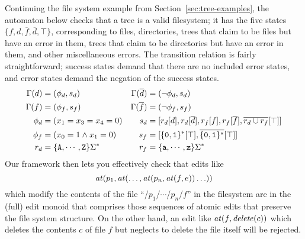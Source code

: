 Continuing the file system example from Section~\ref{sec:tree-examples},
the automaton below checks that a tree is a valid filesystem; it
has the five states $\{f, d, \overline f, \overline d, \top\}$,
corresponding to files, directories, trees that claim to be files but have
an error in them, trees that claim to be directories but have an error in
them, and other miscellaneous errors. The transition relation is fairly
straightforward; success states demand that there are no included error
states, and error states demand the negation of the success states.
\begin{align*}
    \Gamma(d) &= (\phi_d,s_d) &
    \Gamma(\overline d) &= (\lnot \phi_d,s_d) \\
    \Gamma(f) &= (\phi_f,s_f) &
    \Gamma(\overline f) &= (\lnot \phi_f,s_f) \\
    \phi_d &= (x_1 = x_3 = x_4 = 0) &
    s_d &=
        [r_d[d]
        ,r_d[\overline d]
        ,r_f[f]
        ,r_f[\overline f]
        ,\overline{r_d\cup r_f}[\top]
        ] \\
    \phi_f &= (x_0 = 1 \land x_1 = 0) &
    s_f &=
        [          \{\mathtt{0},\mathtt{1}\}^* [\top]
        ,\overline{\{\mathtt{0},\mathtt{1}\}^*}[\top]
        ] \\
    r_d &= \{\mathtt{A},\cdots,\mathtt{Z}\}\Sigma^* &
    r_f &= \{\mathtt{a},\cdots,\mathtt{z}\}\Sigma^*
\end{align*}
Our framework then lets you effectively check that edits like
\[\mathit{at}(p_1,\mathit{at}(\ldots,\mathit{at}(p_n,\mathit{at}(f,e))\ldots))\]
which modify the contents of the file ``/$p_1$/$\cdots$/$p_n$/$f$'' in the
filesystem are in the (full) edit monoid that comprises those sequences of
atomic edits that preserve the file system structure. On the other hand, an
edit like $\mathit{at}(f,\mathit{delete}(c))$ which deletes the contents $c$ of file $f$ but
neglects to delete the file itself will be rejected.


